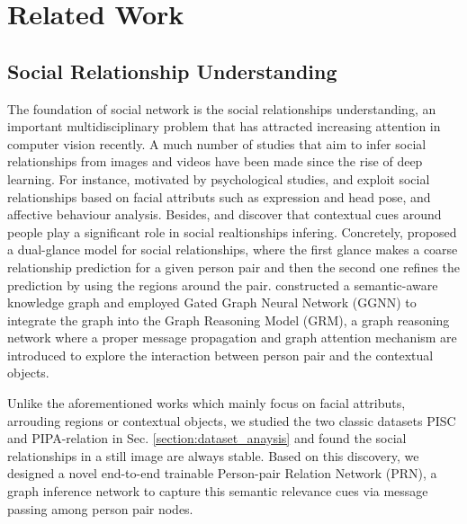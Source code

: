 \documentclass{article}
\newcommand{\PRN}{{\sf PRN}}
\begin{document}
\section{Related Work}

\subsection{Social Relationship Understanding}

The foundation of social network is the social relationships understanding, an important multidisciplinary problem that has attracted increasing attention in computer vision recently. A much number of studies that aim to infer social relationships from images \cite{DBLP:conf/iccv/LiWZK17,DBLP:conf/ijcai/WangCRYCL18,DBLP:conf/eccv/WangGLF10,DBLP:conf/iccv/ZhangLLT15} and videos \cite{DBLP:conf/eccv/DingY10,DBLP:conf/cvpr/RamanathanY013,DBLP:journals/ivc/VinciarelliPB09} have been made since the rise of deep learning. For instance, motivated by psychological studies, \cite{DBLP:conf/iccv/ZhangLLT15} and \cite{DBLP:conf/iccv/DibekliogluSG13} exploit social relationships based on facial attributs such as expression and head pose, and affective behaviour analysis. Besides, \cite{DBLP:conf/iccv/LiWZK17} and \cite{DBLP:conf/ijcai/WangCRYCL18} discover that contextual cues around people play a significant role in social realtionships infering. Concretely, \cite{DBLP:conf/iccv/LiWZK17} proposed a dual-glance model for social relationships, where the first glance makes a coarse relationship prediction for a given person pair and then the second one refines the prediction by using the regions around the pair. \cite{DBLP:conf/ijcai/WangCRYCL18} constructed a semantic-aware knowledge graph and employed Gated Graph Neural Network (GGNN) \cite{DBLP:journals/tomccap/LiSKJZW15} to integrate the graph into the Graph Reasoning Model (GRM), a graph reasoning network where a proper message propagation and graph attention mechanism are introduced to explore the interaction between person pair and the contextual objects.

Unlike the aforementioned works which mainly focus on facial attributs, arrouding regions or contextual objects, we studied the two classic datasets PISC \cite{DBLP:conf/iccv/LiWZK17} and PIPA-relation \cite{DBLP:conf/cvpr/SunSF17} in Sec. \ref{section:dataset_anaysis} and found the social relationships in a still image are always stable. Based on this discovery, we designed a novel end-to-end trainable Person-pair Relation Network (\PRN), a graph inference network to capture this semantic relevance cues via message passing among person pair nodes.
\end{document}
